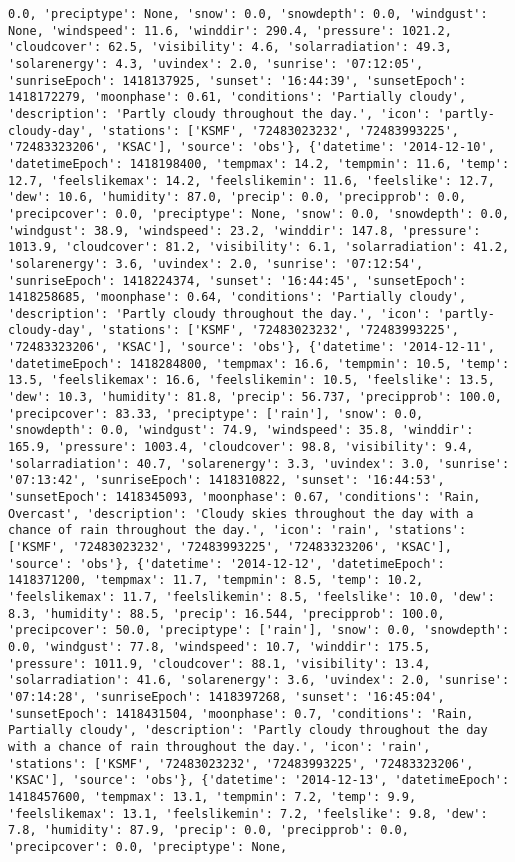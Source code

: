 \documentclass[
  letterpaper,
  DIV=11,
  numbers=noendperiod]{scrartcl}
\begin{document}
\begin{verbatim}
0.0, 'preciptype': None, 'snow': 0.0, 'snowdepth': 0.0, 'windgust': None, 'windspeed': 11.6, 'winddir': 290.4, 'pressure': 1021.2, 'cloudcover': 62.5, 'visibility': 4.6, 'solarradiation': 49.3, 'solarenergy': 4.3, 'uvindex': 2.0, 'sunrise': '07:12:05', 'sunriseEpoch': 1418137925, 'sunset': '16:44:39', 'sunsetEpoch': 1418172279, 'moonphase': 0.61, 'conditions': 'Partially cloudy', 'description': 'Partly cloudy throughout the day.', 'icon': 'partly-cloudy-day', 'stations': ['KSMF', '72483023232', '72483993225', '72483323206', 'KSAC'], 'source': 'obs'}, {'datetime': '2014-12-10', 'datetimeEpoch': 1418198400, 'tempmax': 14.2, 'tempmin': 11.6, 'temp': 12.7, 'feelslikemax': 14.2, 'feelslikemin': 11.6, 'feelslike': 12.7, 'dew': 10.6, 'humidity': 87.0, 'precip': 0.0, 'precipprob': 0.0, 'precipcover': 0.0, 'preciptype': None, 'snow': 0.0, 'snowdepth': 0.0, 'windgust': 38.9, 'windspeed': 23.2, 'winddir': 147.8, 'pressure': 1013.9, 'cloudcover': 81.2, 'visibility': 6.1, 'solarradiation': 41.2, 'solarenergy': 3.6, 'uvindex': 2.0, 'sunrise': '07:12:54', 'sunriseEpoch': 1418224374, 'sunset': '16:44:45', 'sunsetEpoch': 1418258685, 'moonphase': 0.64, 'conditions': 'Partially cloudy', 'description': 'Partly cloudy throughout the day.', 'icon': 'partly-cloudy-day', 'stations': ['KSMF', '72483023232', '72483993225', '72483323206', 'KSAC'], 'source': 'obs'}, {'datetime': '2014-12-11', 'datetimeEpoch': 1418284800, 'tempmax': 16.6, 'tempmin': 10.5, 'temp': 13.5, 'feelslikemax': 16.6, 'feelslikemin': 10.5, 'feelslike': 13.5, 'dew': 10.3, 'humidity': 81.8, 'precip': 56.737, 'precipprob': 100.0, 'precipcover': 83.33, 'preciptype': ['rain'], 'snow': 0.0, 'snowdepth': 0.0, 'windgust': 74.9, 'windspeed': 35.8, 'winddir': 165.9, 'pressure': 1003.4, 'cloudcover': 98.8, 'visibility': 9.4, 'solarradiation': 40.7, 'solarenergy': 3.3, 'uvindex': 3.0, 'sunrise': '07:13:42', 'sunriseEpoch': 1418310822, 'sunset': '16:44:53', 'sunsetEpoch': 1418345093, 'moonphase': 0.67, 'conditions': 'Rain, Overcast', 'description': 'Cloudy skies throughout the day with a chance of rain throughout the day.', 'icon': 'rain', 'stations': ['KSMF', '72483023232', '72483993225', '72483323206', 'KSAC'], 'source': 'obs'}, {'datetime': '2014-12-12', 'datetimeEpoch': 1418371200, 'tempmax': 11.7, 'tempmin': 8.5, 'temp': 10.2, 'feelslikemax': 11.7, 'feelslikemin': 8.5, 'feelslike': 10.0, 'dew': 8.3, 'humidity': 88.5, 'precip': 16.544, 'precipprob': 100.0, 'precipcover': 50.0, 'preciptype': ['rain'], 'snow': 0.0, 'snowdepth': 0.0, 'windgust': 77.8, 'windspeed': 10.7, 'winddir': 175.5, 'pressure': 1011.9, 'cloudcover': 88.1, 'visibility': 13.4, 'solarradiation': 41.6, 'solarenergy': 3.6, 'uvindex': 2.0, 'sunrise': '07:14:28', 'sunriseEpoch': 1418397268, 'sunset': '16:45:04', 'sunsetEpoch': 1418431504, 'moonphase': 0.7, 'conditions': 'Rain, Partially cloudy', 'description': 'Partly cloudy throughout the day with a chance of rain throughout the day.', 'icon': 'rain', 'stations': ['KSMF', '72483023232', '72483993225', '72483323206', 'KSAC'], 'source': 'obs'}, {'datetime': '2014-12-13', 'datetimeEpoch': 1418457600, 'tempmax': 13.1, 'tempmin': 7.2, 'temp': 9.9, 'feelslikemax': 13.1, 'feelslikemin': 7.2, 'feelslike': 9.8, 'dew': 7.8, 'humidity': 87.9, 'precip': 0.0, 'precipprob': 0.0, 'precipcover': 0.0, 'preciptype': None, 
\end{verbatim}
\end{document}
